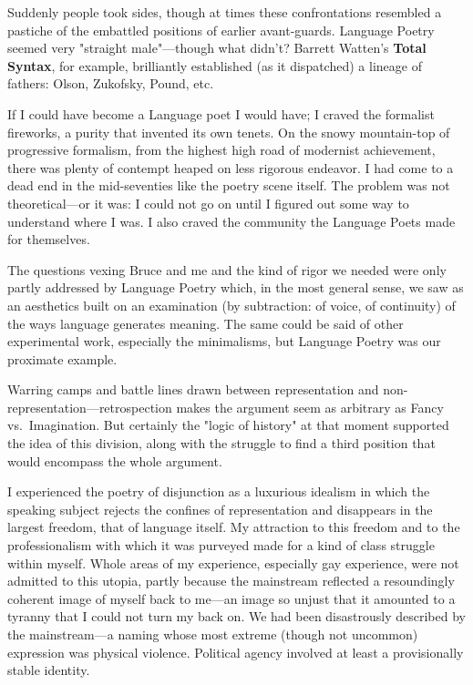 Suddenly people took sides, though at times these confrontations
resembled a pastiche of the embattled positions of earlier avant-guards.
Language Poetry seemed very "straight male"---though what didn't?
Barrett Watten's \textbf{Total Syntax}, for example, brilliantly
established (as it dispatched) a lineage of fathers: Olson, Zukofsky,
Pound, etc.

If I could have become a Language poet I would have; I craved the
formalist fireworks, a purity that invented its own tenets. On the snowy
mountain-top of progressive formalism, from the highest high road of
modernist achievement, there was plenty of contempt heaped on less
rigorous endeavor. I had come to a dead end in the mid-seventies like
the poetry scene itself. The problem was not theoretical---or it was: I
could not go on until I figured out some way to understand where I was.
I also craved the community the Language Poets made for themselves.

The questions vexing Bruce and me and the kind of rigor we needed were
only partly addressed by Language Poetry which, in the most general
sense, we saw as an aesthetics built on an examination (by subtraction:
of voice, of continuity) of the ways language generates meaning. The
same could be said of other experimental work, especially the
minimalisms, but Language Poetry was our proximate example.

Warring camps and battle lines drawn between representation and
non-representation---retrospection makes the argument seem as arbitrary
as Fancy vs.~Imagination. But certainly the "logic of history" at that
moment supported the idea of this division, along with the struggle to
find a third position that would encompass the whole argument.

I experienced the poetry of disjunction as a luxurious idealism in which
the speaking subject rejects the confines of representation and
disappears in the largest freedom, that of language itself. My
attraction to this freedom and to the professionalism with which it was
purveyed made for a kind of class struggle within myself. Whole areas of
my experience, especially gay experience, were not admitted to this
utopia, partly because the mainstream reflected a resoundingly coherent
image of myself back to me---an image so unjust that it amounted to a
tyranny that I could not turn my back on. We had been disastrously
described by the mainstream---a naming whose most extreme (though not
uncommon) expression was physical violence. Political agency involved at
least a provisionally stable identity.

